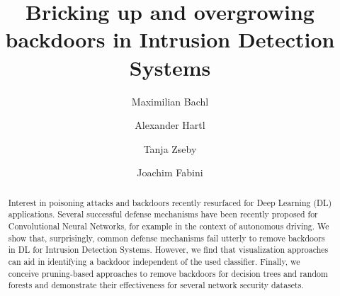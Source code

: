\documentclass[10pt,sigconf,letterpaper]{acmart}
\begin{document}
\title{Bricking up and overgrowing backdoors in Intrusion Detection Systems}

\begin{abstract}
Interest in poisoning attacks and backdoors recently resurfaced for Deep Learning (DL) applications. Several successful defense mechanisms have been recently proposed for Convolutional Neural Networks, for example in the context of autonomous driving. We show that, surprisingly, common defense mechanisms fail utterly to remove backdoors in DL for Intrusion Detection Systems. However, we find that visualization approaches can aid in identifying a backdoor independent of the used classifier. Finally, we conceive pruning-based approaches to remove backdoors for decision trees and random forests and demonstrate their effectiveness for several network security datasets. 
\end{abstract}

\author{Maximilian Bachl}

\author{Alexander Hartl}

\author{Tanja Zseby}

\author{Joachim Fabini}


\end{document}
